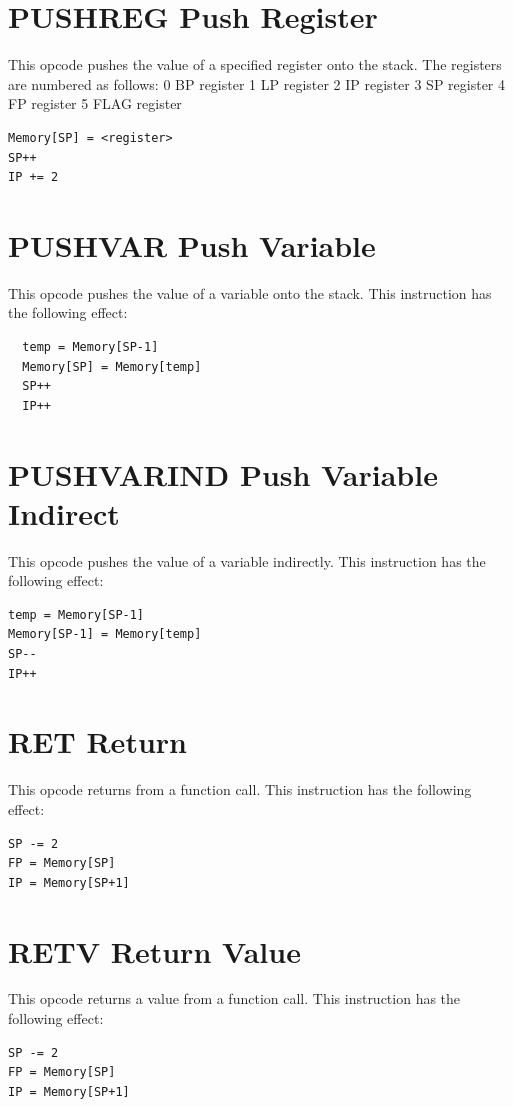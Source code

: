 \documentclass[11pt,a4paper,oneside]{book}
\begin{document}
\pagebreak
\section[PUSHREG]{\texorpdfstring{PUSHREG \hfill Push Register}{PUSHREG -- Push Register}}
This opcode pushes the value of a specified register onto the stack. The registers are numbered as follows:
0 BP register
1 LP register
2 IP register
3 SP register
4 FP register
5 FLAG register
\begin{verbatim}
Memory[SP] = <register>
SP++
IP += 2
\end{verbatim}

\pagebreak
\section[PUSHVAR]{\texorpdfstring{PUSHVAR \hfill Push Variable}{PUSHVAR -- Push Variable}}
This opcode pushes the value of a variable onto the stack. This instruction has the following effect:
\begin{verbatim}
  temp = Memory[SP-1]
  Memory[SP] = Memory[temp]
  SP++
  IP++
\end{verbatim}

\pagebreak
\section[PUSHVARIND]{\texorpdfstring{PUSHVARIND \hfill Push Variable Indirect}{PUSHVARIND -- Push Variable Indirect}}
This opcode pushes the value of a variable indirectly. This instruction has the following effect:
\begin{verbatim}
temp = Memory[SP-1]
Memory[SP-1] = Memory[temp]
SP--
IP++
\end{verbatim}

\pagebreak
\section[RET]{\texorpdfstring{RET \hfill Return}{RET -- Return}}
This opcode returns from a function call. This instruction has the following effect:
\begin{verbatim}
SP -= 2
FP = Memory[SP]
IP = Memory[SP+1]
\end{verbatim}

\pagebreak
\section[RETV]{\texorpdfstring{RETV \hfill Return Value}{RETV -- Return Value}}
This opcode returns a value from a function call. This instruction has the following effect:
\begin{verbatim}
SP -= 2
FP = Memory[SP]
IP = Memory[SP+1]
\end{verbatim}
\end{document}
